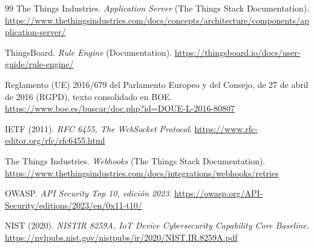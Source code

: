 \documentclass[11pt,a4paper]{article}
\begin{document}
\begin{thebibliography}{99}
     The Things Industries. \emph{Application Server} (The Things Stack Documentation). \url{https://www.thethingsindustries.com/docs/concepts/architecture/components/application-server/}

     ThingsBoard. \emph{Rule Engine} (Documentation). \url{https://thingsboard.io/docs/user-guide/rule-engine/}

     Reglamento (UE) 2016/679 del Parlamento Europeo y del Consejo, de 27 de abril de 2016 (RGPD), texto consolidado en BOE. \url{https://www.boe.es/buscar/doc.php?id=DOUE-L-2016-80807}

     IETF (2011). \emph{RFC 6455, The WebSocket Protocol}. \url{https://www.rfc-editor.org/rfc/rfc6455.html}

     The Things Industries. \emph{Webhooks} (The Things Stack Documentation). \url{https://www.thethingsindustries.com/docs/integrations/webhooks/retries}

     OWASP. \emph{API Security Top 10, edición 2023}. \url{https://owasp.org/API-Security/editions/2023/en/0x11-t10/}

     NIST (2020). \emph{NISTIR 8259A, IoT Device Cybersecurity Capability Core Baseline}. \url{https://nvlpubs.nist.gov/nistpubs/ir/2020/NIST.IR.8259A.pdf}
\end{thebibliography}
\end{document}
